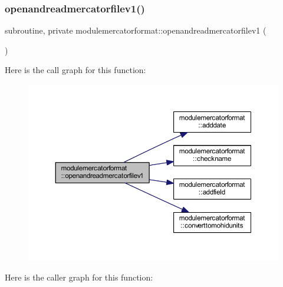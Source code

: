 \subsubsection{\texorpdfstring{openandreadmercatorfilev1()}{openandreadmercatorfilev1()}}
{\footnotesize\ttfamily subroutine, private modulemercatorformat\+::openandreadmercatorfilev1 (\begin{DoxyParamCaption}{ }\end{DoxyParamCaption})\hspace{0.3cm}{\ttfamily [private]}}

Here is the call graph for this function\+:\nopagebreak
\begin{figure}[H]
\begin{center}
\leavevmode
\includegraphics[width=350pt]{namespacemodulemercatorformat_a2cf596b9eace6fa889296e8e6079f834_cgraph}
\end{center}
\end{figure}
Here is the caller graph for this function\+:\nopagebreak
